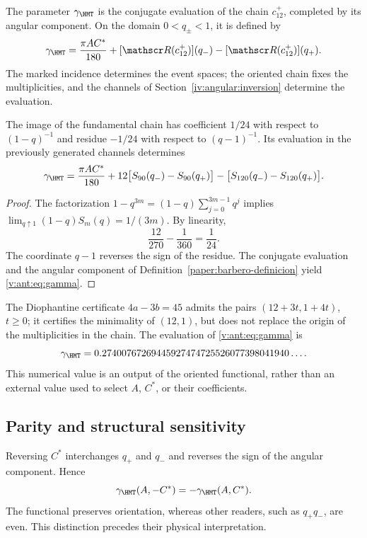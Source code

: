 \begin{definition}
\label{paper:barbero-definicion}
The parameter \(\gamma_{\HMT}\) is the conjugate evaluation of the chain
\(c_{12}^{+}\), completed by its angular component. On the domain
\(0<q_\pm<1\), it is defined by
\[
\gamma_{\HMT}=\frac{\pi AC^*}{180}
+[\mathscr R(c_{12}^{+})](q_-)-[\mathscr R(c_{12}^{+})](q_+).
\]
The marked incidence determines the event spaces; the oriented
chain fixes the multiplicities, and the channels of
Section~\ref{iv:angular:inversion} determine the evaluation.
\end{definition}

\begin{theorem}
The image of the fundamental chain has coefficient $1/24$
with respect to $(1-q)^{-1}$ and residue $-1/24$ with respect to $(q-1)^{-1}$.
Its evaluation in the previously generated channels determines
\begin{equation}
\gamma_{\HMT}=
\frac{\pi AC^*}{180}
+12\bigl[S_{90}(q_-)-S_{90}(q_+)\bigr]
-\bigl[S_{120}(q_-)-S_{120}(q_+)\bigr].
\label{v:ant:eq:gamma}
\end{equation}
\end{theorem}
\begin{proof}
The factorization $1-q^{3m}=(1-q)\sum_{j=0}^{3m-1}q^j$ implies
$\lim_{q\uparrow1}(1-q)S_m(q)=1/(3m)$. By linearity,
\[
\frac{12}{270}-\frac1{360}=\frac1{24}.
\]
The coordinate $q-1$ reverses the sign of the residue.
The conjugate evaluation and the angular component of Definition~\ref{paper:barbero-definicion}
yield \eqref{v:ant:eq:gamma}.
\end{proof}

The Diophantine certificate $4a-3b=45$ admits the pairs
$(12+3t,1+4t)$, $t\ge0$; it certifies the minimality of $(12,1)$,
but does not replace the origin of the multiplicities in the chain.
The evaluation of \eqref{v:ant:eq:gamma} is
\[
\gamma_{\HMT}
=0.27400767269445927474725526077398041940\ldots.
\]
This numerical value is an output of the oriented functional, rather than an external value
used to select $A$, $C^*$, or their coefficients.

\subsection{Parity and structural sensitivity}
Reversing $C^*$ interchanges $q_+$ and $q_-$ and reverses the sign
of the angular component. Hence
\[
\gamma_{\HMT}(A,-C^*)=-\gamma_{\HMT}(A,C^*).
\]
The functional preserves orientation, whereas other readers,
such as $q_+q_-$, are even. This distinction precedes their physical interpretation.
